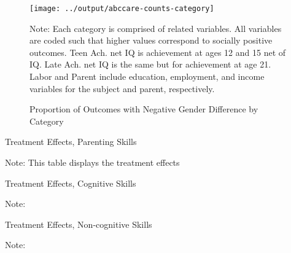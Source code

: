 \begin{figure}[H]
\begin{center}
\caption{Proportion of Outcomes with Negative Gender Difference by Category}
\label{fig:prop-category}
\texttt{[image: ../output/abccare-counts-category]}
\end{center}
\raggedright \footnotesize
Note: Each category is comprised of related variables. All variables are coded such that higher values correspond to socially positive outcomes. Teen Ach. net IQ is achievement at ages 12 and 15 net of IQ. Late Ach. net IQ is the same but for achievement at age 21. Labor and Parent include education, employment, and income variables for the subject and parent, respectively. 
\end{figure}

\begin{table}[H]
\centering
\caption{Treatment Effects, Parenting Skills}
\label{te-parenting}
\begin{adjustbox}{width=\textwidth}
\begin{threeparttable}
	
\begin{tablenotes}
\item Note: This table displays the treatment effects 
\end{tablenotes}
\end{threeparttable}
\end{adjustbox}
\end{table}

\begin{table}[H]
\centering
\caption{Treatment Effects, Cognitive Skills}
\label{te-cognitive}
\begin{adjustbox}{width=\textwidth}
\begin{threeparttable}
	
\begin{tablenotes}
\item Note:
\end{tablenotes}
\end{threeparttable}
\end{adjustbox}
\end{table}

\begin{table}[H]
\centering
\caption{Treatment Effects, Non-cognitive Skills}
\label{te-ncognitive}
\begin{adjustbox}{width=\textwidth}
\begin{threeparttable}
	
\begin{tablenotes}
\item Note:
\end{tablenotes}
\end{threeparttable}
\end{adjustbox}
\end{table}

